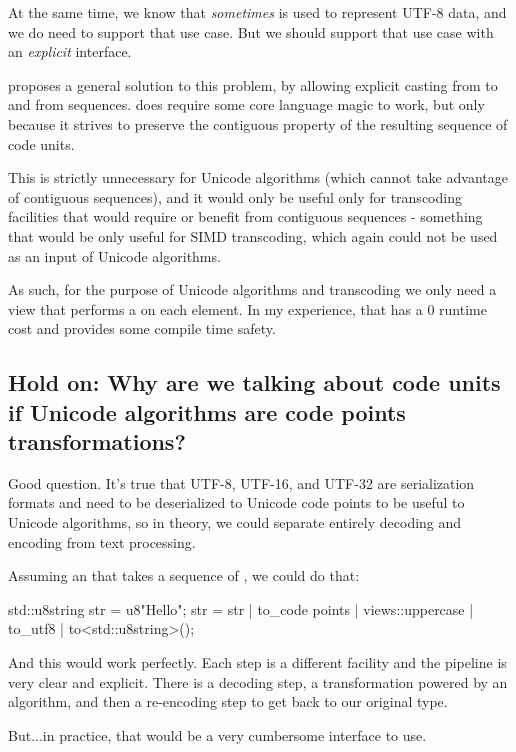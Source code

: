 \documentclass{wg21}
\begin{document}
At the same time, we know that \emph{sometimes}  is used to represent UTF-8 data, and we do need to support that use case. But we should support that use case with an \emph{explicit} interface.

 proposes a general solution to this problem, by allowing explicit casting from  to and from  sequences.
 does require some core language magic to work, but only because it strives to preserve the contiguous property of the resulting sequence of code units.

This is strictly unnecessary for Unicode algorithms (which cannot take advantage of contiguous sequences), and it would only be useful only for transcoding
facilities that would require or benefit from contiguous sequences - something that would be only useful for SIMD transcoding, which again could not be used as an input of Unicode algorithms.

As such, for the purpose of Unicode algorithms and transcoding we only need a view that performs a  on each element.
In my experience, that has a 0 runtime cost and provides some compile time safety.

\subsection{Hold on: Why are we talking about code units if Unicode algorithms are code points transformations?}

Good question.
It's true that UTF-8, UTF-16, and UTF-32 are serialization formats and need to be deserialized to Unicode code points to be useful
to Unicode algorithms, so in theory, we could separate entirely decoding and encoding from text processing.

Assuming an  that takes a sequence of , we could do that:

\begin{colorblock}
std::u8string str = u8"Hello";
str = str | to_code points |  views::uppercase | to_utf8 | to<std::u8string>();
\end{colorblock}


And this would work perfectly.
Each step is a different facility and the pipeline is very clear and explicit.
There is a decoding step, a transformation powered by an algorithm, and then a re-encoding step to get back to our original type.

But...in practice, that would be a very cumbersome interface to use.
\end{document}

